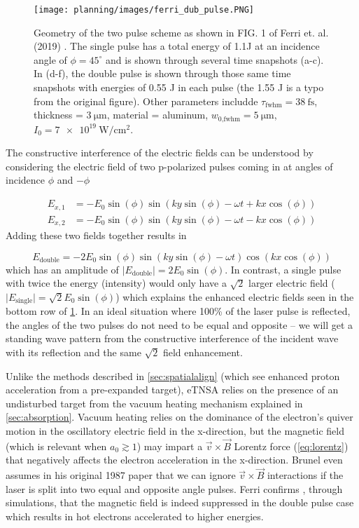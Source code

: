 \begin{figure}
	\centering 
	\texttt{[image: planning/images/ferri\_dub\_pulse.PNG]}
	\caption{Geometry of the two pulse scheme as shown in FIG. 1 of Ferri et. al. (2019) \cite{Ferri_2019_Nat_Comm}. The single pulse has a total energy of 1.1J at an incidence angle of $\phi=45^\circ$ and is shown through several time snapshots (a-c). In (d-f), the double pulse is shown through those same time snapshots with energies of 0.55 J in each pulse (the 1.55 J is a typo from the original figure). Other parameters includde $\tau_\text{fwhm} = \SI{38}{\femto \second}$, thickness = $\SI{3}{\micro \meter}$, material = aluminum, $w_\text{0,fwhm} = \SI{5}{\micro \meter}$, $I_0 = \SI{7e19}{\watt \per \centi \meter \squared}$.}
	\label{fig:ferri_dub_pulse}
\end{figure}
The constructive interference of the electric fields can be understood by considering the electric field of two p-polarized pulses coming in at angles of incidence $\phi$ and $-\phi$

\begin{align}
	E_{x,1} &= -E_0 \sin(\phi) \sin(k y \sin(\phi) - \omega t + k x \cos(\phi)) \\
	E_{x,2} &= -E_0 \sin(\phi) \sin(k y \sin(\phi) - \omega t - k x \cos(\phi))
\end{align}
Adding these two fields together results in 

\begin{equation}
	E_\text{double} = -2 E_0 \sin(\phi) \sin(k y \sin(\phi) - \omega t) \cos(k x \cos(\phi))
\end{equation}
which has an amplitude of $\lvert E_\text{double} \rvert = 2 E_0 \sin(\phi)$. In contrast, a single pulse with twice the energy (intensity) would only have a $\sqrt{2}$ larger electric field ($\lvert E_\text{single} \rvert = \sqrt{2} E_0 \sin(\phi)$) which explains the enhanced electric fields seen in the bottom row of \cref{fig:ferri_dub_pulse}. In an ideal situation where 100\% of the laser pulse is reflected, the angles of the two pulses do not need to be equal and opposite -- we will get a standing wave pattern from the constructive interference of the incident wave with its reflection and the same $\sqrt{2}$ field enhancement.  

Unlike the methods described in \cref{sec:spatialalign} (which see enhanced proton acceleration from a pre-expanded target), \gls{eTNSA} relies on the presence of an undisturbed target from the vacuum heating mechanism \cite{Brunel_1987_PRL} explained in \cref{sec:absorption}. Vacuum heating relies on the dominance of the electron's quiver motion in the oscillatory electric field in the x-direction, but the magnetic field (which is relevant when $a_0 \gtrsim 1$) may impart a $\vec{v} \times \vec{B}$ Lorentz force (\cref{eq:lorentz}) that negatively affects the electron acceleration in the x-direction. Brunel even assumes in his original 1987 paper \cite{Brunel_1987_PRL} that we can ignore $\vec{v} \times \vec{B}$ interactions if the laser is split into two equal and opposite angle pulses. Ferri confirms \cite{Ferri_2019_Nat_Comm}, through simulations, that the magnetic field is indeed suppressed in the double pulse case which results in hot electrons accelerated to higher energies. 

